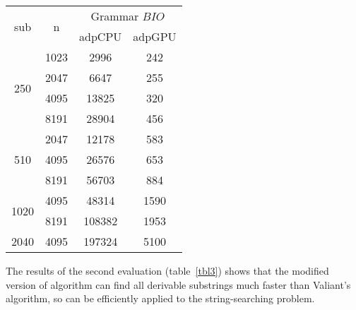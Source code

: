 \begin{table*}

\begin{center}
\caption{Results of applying the modification to the string-searching problem}
\label{tbl3}
    \begin{tabular}{ ||c||c||c|c|| } 
    \hline
    \multirow{2}{1.5em}{sub} & \multirow{2}{0.7em}{n} & \multicolumn{2}{c||}{Grammar $BIO$} \\
    & & adpCPU &  adpGPU \\
    \hline
    \multirow{4}{1.5em}{250} & 1023 & 2996 & 242 \\ 
    & 2047 & 6647 & 255\\ 
    & 4095 & 13825 & 320\\ 
    & 8191 & 28904 & 456\\ 
    \hline
    \multirow{3}{1.5em}{510} & 2047 & 12178 & 583\\
    & 4095 & 26576 & 653\\
    & 8191 & 56703 & 884\\ 
    \hline
    \multirow{2}{2em}{1020} & 4095 & 48314 & 1590 \\
    & 8191 & 108382 & 1953\\ 
    \hline
    2040 & 4095 & 197324 & 5100\\ 
    \hline
    \end{tabular}
\end{center}

\end{table*}

The results of the second evaluation (table~\ref{tbl3}) shows that the modified version of algorithm can find all derivable substrings much faster than Valiant's algorithm, so can be efficiently applied to the string-searching problem.